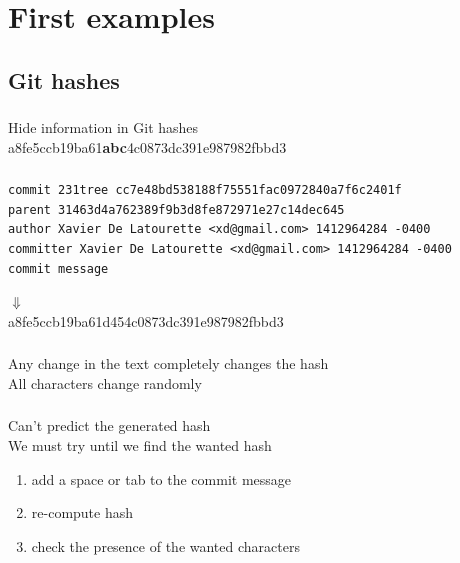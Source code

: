 \documentclass{beamer}
\begin{document}
\section{First examples}

\subsection{Git hashes}
\begin{frame}
\frametitle{\insertsubsectionhead}
  Hide information in Git hashes\\
  a8fe5ccb19ba61\textbf{abc}4c0873dc391e987982fbbd3\\
\end{frame}

\begin{frame}[fragile]
  \frametitle{\insertsubsectionhead}
  \begin{lstlisting}[frame=single, breaklines=true, basicstyle=\tiny]
commit 231tree cc7e48bd538188f75551fac0972840a7f6c2401f
parent 31463d4a762389f9b3d8fe872971e27c14dec645
author Xavier De Latourette <xd@gmail.com> 1412964284 -0400
committer Xavier De Latourette <xd@gmail.com> 1412964284 -0400
commit message
  \end{lstlisting}
  \begin{center}
  	$\Downarrow$\\
  	\medskip
  	a8fe5ccb19ba61d454c0873dc391e987982fbbd3
  \end{center}
\end{frame}

\begin{frame}
  \frametitle{\insertsubsectionhead}
  Any change in the text completely changes the hash\\
  All characters change randomly
\end{frame}

\begin{frame}
  \frametitle{\insertsubsectionhead}
  Can't predict the generated hash\\
  We must try until we find the wanted hash
  
  \begin{enumerate}
  	\item add a space or tab to the commit message
    \item re-compute hash
    \item check the presence of the wanted characters
  \end{enumerate}
\end{frame}
\end{document}
